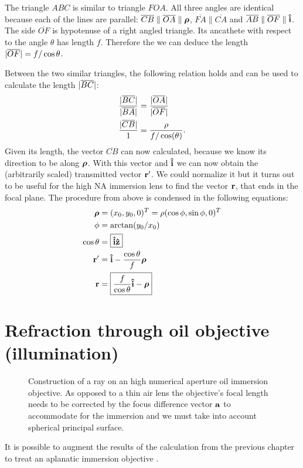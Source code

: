 The triangle $ABC$ is similar to triangle $FOA$. All three angles are
identical because each of the lines are parallel:
$\overline{CB} \parallel \overline{OA} \parallel \boldsymbol\rho$,
$\overline{FA} \parallel \overline{CA}$ and $\overline{AB} \parallel
\overline{OF} \parallel \mathbf{\hat{i}}$. The side $\overline{OF}$ is hypotenuse of
a right angled triangle. Its ancathete with respect to the angle
$\theta$ has length $f$. Therefore the we can deduce the length
$\mathopen| \overline{OF} \mathclose|=f/\cos\theta$.

Between the two similar triangles, the following relation holds and
can be used to calculate the length $\mathopen| \overline{BC} \mathclose|$:
\begin{align}
  \frac{\mathopen| \overline{BC} \mathclose|}{\mathopen| \overline{BA} \mathclose|}&=
  \frac{\mathopen| \overline{OA} \mathclose|}{\mathopen| \overline{OF} \mathclose|}\\
  \frac{\mathopen| \overline{CB} \mathclose|}{1}&=
  \frac{\rho}{f/\cos(\theta)}.
\end{align}
Given its length, the vector $\overline{CB}$ can now calculated,
because we know its direction to be along $\boldsymbol\rho$. With this vector
and $\mathbf{\hat{i}}$ we can now obtain the (arbitrarily scaled) transmitted vector
$\mathbf{r}'$. We could normalize it but it turns out to be useful for the
high NA immersion lens to find the vector $\mathbf{r}$, that ends in the focal
plane.  The procedure from above is condensed in the following
equations:
\begin{align}
  \boldsymbol\rho&=(x_0,y_0,0)^T=\rho (\cos\phi,\sin\phi,0)^T\\
  \phi&=\arctan(y_0/x_0)\\
  \cos\theta&=\boxed{\mathbf{\hat{i}}\mathbf{\hat{z}}}\\
  \mathbf{r}'&=\mathbf{\hat{i}}- \frac{\cos\theta}{f}\boldsymbol\rho\\
  \mathbf{r}&=\boxed{\frac{f}{\cos\theta} \mathbf{\hat{i}} -\boldsymbol\rho}
\end{align}

\section{Refraction through oil objective (illumination)}
\begin{figure}[!hbt]
  \centering
  
  \caption{Construction of a ray on an high numerical aperture oil
    immersion objective. As opposed to a thin air lens the objective's
    focal length needs to be corrected by the focus difference vector
    $\mathbf{a}$ to accommodate for the immersion and we must take into
    account spherical principal surface.}
\end{figure}
It is possible to augment the results of the calculation from the
previous chapter to treat an aplanatic immersion objective
\citep{Hwang2008}.

